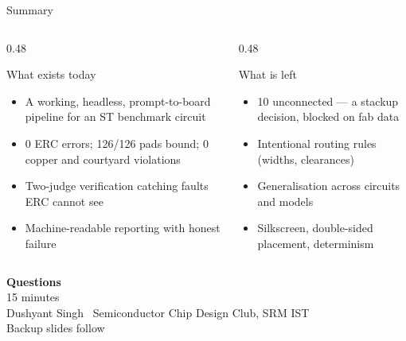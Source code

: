 \documentclass[aspectratio=169,10pt]{beamer}
\begin{document}
\begin{frame}{Summary}
\vspace{2mm}
\begin{columns}[T]
\begin{column}{0.48\textwidth}
\begin{block}{What exists today}
\small
\begin{itemize}\footnotesize
  \item A working, headless, prompt-to-board pipeline for an ST benchmark circuit
  \item 0 ERC errors; 126/126 pads bound; 0 copper and courtyard violations
  \item Two-judge verification catching faults ERC cannot see
  \item Machine-readable reporting with honest failure
\end{itemize}
\end{block}
\end{column}
\begin{column}{0.48\textwidth}
\begin{block}{What is left}
\small
\begin{itemize}\footnotesize
  \item 10 unconnected --- a stackup decision, blocked on fab data
  \item Intentional routing rules (widths, clearances)
  \item Generalisation across circuits and models
  \item Silkscreen, double-sided placement, determinism
\end{itemize}
\end{block}
\end{column}
\end{columns}
\vspace{3mm}
\begin{center}
\end{center}
\end{frame}

{
\begin{frame}[plain]
\vfill
\begin{center}
{\color{white}\LARGE\textbf{Questions}}\\[10pt]
{\color{stcyan}\footnotesize 15 minutes}\\[14pt]
{\color{white}\small Dushyant Singh \textbullet\ Semiconductor Chip Design Club, SRM IST}\\[3pt]
{\color{stcyan}\footnotesize Backup slides follow}
\end{center}
\vfill
\end{frame}}
\end{document}
